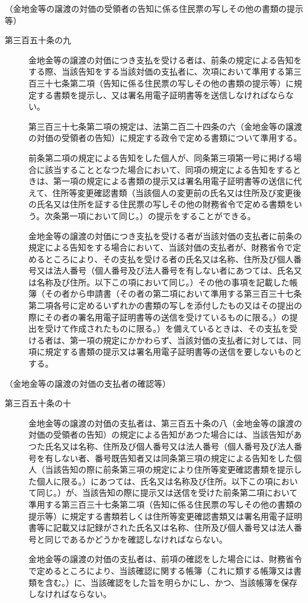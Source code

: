 \documentclass[twocolumn,a4j,10pt]{ltjtarticle}
\begin{document}
\noindent\hspace{10pt}（金地金等の譲渡の対価の受領者の告知に係る住民票の写しその他の書類の提示等）
\begin{description}
\item[第三百五十条の九]金地金等の譲渡の対価につき支払を受ける者は、前条の規定による告知をする際、当該告知をする当該対価の支払者に、次項において準用する第三百三十七条第二項（告知に係る住民票の写しその他の書類の提示等）に規定する書類を提示し、又は署名用電子証明書等を送信しなければならない。
\item[]第三百三十七条第二項の規定は、法第二百二十四条の六（金地金等の譲渡の対価の受領者の告知）に規定する政令で定める書類について準用する。
\item[]前条第二項の規定による告知をした個人が、同条第三項第一号に掲げる場合に該当することとなつた場合において、同項の規定による告知をするときは、第一項の規定による書類の提示又は署名用電子証明書等の送信に代えて、住所等変更確認書類（当該個人の変更前の氏名又は住所及び変更後の氏名又は住所を証する住民票の写しその他の財務省令で定める書類をいう。次条第一項において同じ。）の提示をすることができる。
\item[]金地金等の譲渡の対価につき支払を受ける者が当該対価の支払者に前条の規定による告知をする場合において、当該対価の支払者が、財務省令で定めるところにより、その支払を受ける者の氏名又は名称、住所及び個人番号又は法人番号（個人番号及び法人番号を有しない者にあつては、氏名又は名称及び住所。以下この項において同じ。）その他の事項を記載した帳簿（その者から申請書（その者の第二項において準用する第三百三十七条第二項各号に定めるいずれかの書類の写しを添付したもの又はその提出の際にその者の署名用電子証明書等の送信を受けているものに限る。）の提出を受けて作成されたものに限る。）を備えているときは、その支払を受ける者は、第一項の規定にかかわらず、当該対価の支払者に対しては、同項に規定する書類の提示又は署名用電子証明書等の送信を要しないものとする。
\end{description}
\noindent\hspace{10pt}（金地金等の譲渡の対価の支払者の確認等）
\begin{description}
\item[第三百五十条の十]金地金等の譲渡の対価の支払者は、第三百五十条の八（金地金等の譲渡の対価の受領者の告知）の規定による告知があつた場合には、当該告知があつた氏名又は名称、住所及び個人番号又は法人番号（個人番号及び法人番号を有しない者、番号既告知者又は同条第三項の規定による告知をした個人（当該告知の際に前条第三項の規定により住所等変更確認書類を提示した個人に限る。）にあつては、氏名又は名称及び住所。以下この項において同じ。）が、当該告知の際に提示又は送信を受けた前条第二項において準用する第三百三十七条第二項（告知に係る住民票の写しその他の書類の提示等）に規定する書類若しくは住所等変更確認書類又は署名用電子証明書等に記載又は記録がされた氏名又は名称、住所及び個人番号又は法人番号と同じであるかどうかを確認しなければならない。
\item[]金地金等の譲渡の対価の支払者は、前項の確認をした場合には、財務省令で定めるところにより、当該確認に関する帳簿（これに類する帳簿又は書類を含む。）に、当該確認をした旨を明らかにし、かつ、当該帳簿を保存しなければならない。
\end{description}
\end{document}
